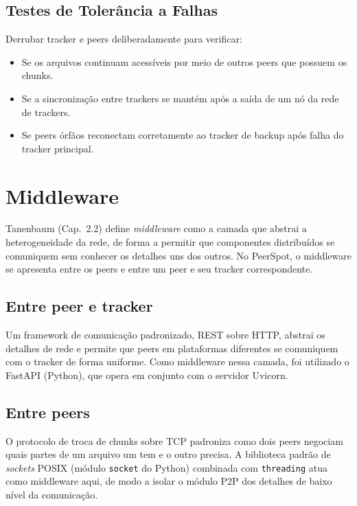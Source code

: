 \documentclass[12pt, a4paper]{article}
\begin{document}
\subsection{Testes de Tolerância a Falhas}
Derrubar tracker e peers deliberadamente para verificar:
\begin{itemize}
    \item Se os arquivos continuam acessíveis por meio de outros peers que possuem os chunks.
    \item Se a sincronização entre trackers se mantém após a saída de um nó da rede de trackers.
    \item Se peers órfãos reconectam corretamente ao tracker de backup após falha do tracker principal.
\end{itemize}

\section{Middleware}\label{sec:middleware}

Tanenbaum (Cap.~2.2) define \textit{middleware} como a camada que abstrai a heterogeneidade da rede, de forma a permitir que componentes distribuídos se comuniquem sem conhecer os detalhes uns dos outros. No PeerSpot, o middleware se apresenta entre os peers e entre um peer e seu tracker correspondente.

\subsection{Entre peer e tracker}
Um framework de comunicação padronizado, REST sobre HTTP, abstrai os detalhes de rede e permite que peers em plataformas diferentes se comuniquem com o tracker de forma uniforme. Como middleware nessa camada, foi utilizado o FastAPI (Python), que opera em conjunto com o servidor Uvicorn.

\subsection{Entre peers}
O protocolo de troca de chunks sobre TCP padroniza como dois peers negociam quais partes de um arquivo um tem e o outro precisa. A biblioteca padrão de \textit{sockets} POSIX (módulo \texttt{socket} do Python) combinada com \texttt{threading} atua como middleware aqui, de modo a isolar o módulo P2P dos detalhes de baixo nível da comunicação.
\end{document}
